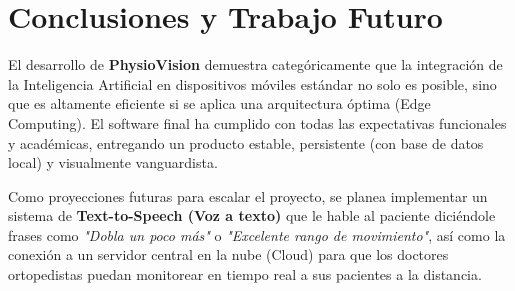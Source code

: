 \documentclass[12pt, a4paper]{article}
\begin{document}
\section{Conclusiones y Trabajo Futuro}
El desarrollo de \textbf{PhysioVision} demuestra categóricamente que la integración de la Inteligencia Artificial en dispositivos móviles estándar no solo es posible, sino que es altamente eficiente si se aplica una arquitectura óptima (Edge Computing). El software final ha cumplido con todas las expectativas funcionales y académicas, entregando un producto estable, persistente (con base de datos local) y visualmente vanguardista.

Como proyecciones futuras para escalar el proyecto, se planea implementar un sistema de \textbf{Text-to-Speech (Voz a texto)} que le hable al paciente diciéndole frases como \textit{"Dobla un poco más"} o \textit{"Excelente rango de movimiento"}, así como la conexión a un servidor central en la nube (Cloud) para que los doctores ortopedistas puedan monitorear en tiempo real a sus pacientes a la distancia.
\end{document}
